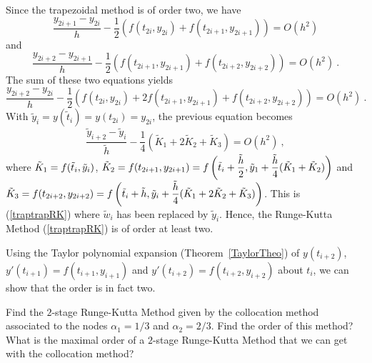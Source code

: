 {Since the trapezoidal method is of order two, we have
\[
\frac{y_{2i+1} - y_{2i}}{h}
- \frac{1}{2}\left( f(t_{2i},y_{2i}) + f(t_{2i+1},y_{2i+1}) \right) = O(h^2)
\]
and
\[
\frac{y_{2i+2} - y_{2i+1}}{h}
- \frac{1}{2}\left( f(t_{2i+1},y_{2i+1}) + f(t_{2i+2},y_{2i+2}) \right)
= O(h^2)\ .
\]
The sum of these two equations yields
\[
\frac{y_{2i+2} - y_{2i}}{h}
- \frac{1}{2}\left( f(t_{2i},y_{2i}) + 2f(t_{2i+1},y_{2i+1})  +
f(t_{2i+2},y_{2i+2}) \right) = O(h^2)\ . 
\]
With $\tilde{y}_i = y(\tilde{t}_i) = y(t_{2i}) = y_{2i}$, the previous
equation becomes
\[
\frac{\tilde{y}_{i+2} - \tilde{y}_i}{\tilde{h}}
- \frac{1}{4}\left( \tilde{K}_1 + 2 \tilde{K}_2 + \tilde{K}_3\right)
= O(h^2) \ ,
\]
where
$\displaystyle \tilde{K}_1 = f(\tilde{t}_i,\tilde{y}_i)$,
$\displaystyle \tilde{K}_2 = f(t_{2i+1},y_{2i+1})
= f\left(\tilde{t}_i+ \frac{\tilde{h}}{2}, \tilde{y}_1
+ \frac{\tilde{h}}{4} ( \tilde{K}_1 + \tilde{K}_2) \right)$ and \\
$\displaystyle \tilde{K}_3 = f(t_{2i+2},y_{2i+2})
= f\left( \tilde{t}_i + \tilde{h} , \tilde{y}_i + \frac{\tilde{h}}{4}
(\tilde{K}_1 + 2 \tilde{K}_2 + \tilde{K}_3)\right)$.  This is
(\ref{traptrapRK}) where $\tilde{w}_i$ has been replaced by
$\tilde{y}_i$.  Hence, the Runge-Kutta Method
(\ref{traptrapRK}) is of order at least two.

Using the Taylor polynomial expansion (Theorem~\ref{TaylorTheo}) of
$y(t_{i+2})$, $y'(t_{i+1}) = f(t_{i+1},y_{i+1})$ and 
$y'(t_{i+2}) = f(t_{i+2},y_{i+2})$ about $t_i$, we can show that
the order is in fact two.
}

\begin{question}
Find the $2$-stage Runge-Kutta Method given by the collocation method
associated to the nodes $\alpha_1 = 1/3$ and $\alpha_2 = 2/3$.  Find the order
of this method?  What is the maximal order of a $2$-stage Runge-Kutta
Method that we can get with the collocation method?
\end{question}

